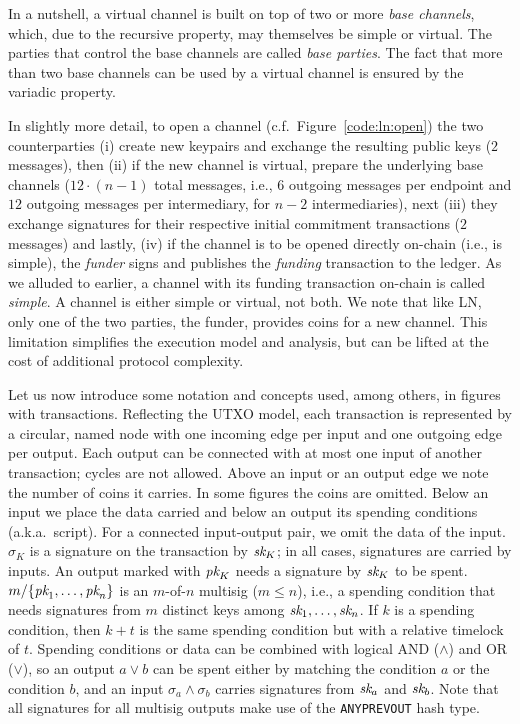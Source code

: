   In a nutshell, a virtual channel is built on top of two or more \emph{base
  channels}, which, due to the recursive property, may themselves be simple or
  virtual. The parties that control the base channels are called \emph{base
  parties}. The fact that more than two base channels can be used by a
  virtual channel is ensured by the variadic property.

  In slightly more detail, to open a channel (c.f.\ Figure~\ref{code:ln:open})
  the two counterparties (i) create new keypairs and exchange the resulting
  public keys ($2$ messages), then (ii) if the new channel is virtual, prepare
  the underlying base channels ($12 \cdot (n-1)$ total messages,
  i.e., $6$ outgoing messages per endpoint and $12$ outgoing messages per
  intermediary, for $n-2$ intermediaries), next (iii) they exchange signatures
  for their respective initial commitment transactions ($2$ messages) and
  lastly, (iv) if the channel is to be opened directly on-chain (i.e., is
  simple), the \emph{funder} signs and publishes the \emph{funding} transaction to the
  ledger. As we alluded to earlier, a channel with its funding transaction
  on-chain is called \emph{simple}. A channel is either simple or virtual, not
  both. We note that like LN, only one of the two parties, the funder,
  provides coins for a new channel. This limitation simplifies the execution
  model and analysis, but can be lifted at the cost of additional protocol
  complexity.

  Let us now introduce some notation and concepts used, among others, in figures
  with transactions.
  Reflecting the UTXO model, each transaction is represented by a circular,
  named node with one incoming edge per input and one outgoing edge per output.
  Each output can be connected with at most one input of another transaction;
  cycles are not allowed. Above an input or an output edge we note the number of
  coins it carries. In some figures the coins are omitted. Below an input we
  place the data carried and below an output its spending conditions (a.k.a.\
  script). For
  a connected input-output pair, we omit the data of the input.
  $\sigma_K$ is a signature on the transaction by $\textit{sk}_{K}$; in all cases, signatures
  are carried by inputs. An output marked
  with $\textit{pk}_{K}$ needs a signature by $\textit{sk}_{K}$ to be spent. $m/\{\textit{pk}_{1}, \dots,
  \textit{pk}_{n}\}$ is an $m$-of-$n$ multisig ($m \leq n$), i.e., a spending condition that needs signatures from
  $m$ distinct keys among $\textit{sk}_{1}, \dots, \textit{sk}_{n}$. If $k$ is a spending
  condition, then $k + t$ is the same spending condition but with a relative timelock
  of $t$. Spending conditions or data can be combined with logical AND
  ($\wedge$) and OR ($\vee$), so an output $a \vee b$ can be spent either by
  matching the condition $a$ or the condition $b$, and an input $\sigma_a \wedge
  \sigma_b$ carries signatures from $\textit{sk}_{a}$ and $\textit{sk}_{b}$.
  Note that all signatures for all multisig outputs make use of the
  \texttt{ANYPREVOUT} hash type.

